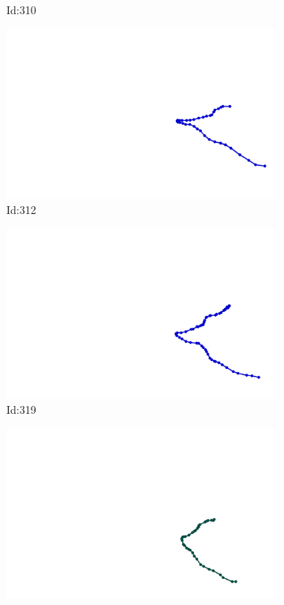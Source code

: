 \documentclass[12pt,twoside]{report}
\begin{document}
\begin{figure}
\begin{subfigure}[b]{0.20\textwidth}
\caption{Id:310}
\end{subfigure}
\begin{subfigure}[b]{0.20\textwidth}
\centering
\includegraphics[width=\textwidth]{../trajectories/312.png}
\caption{Id:312}
\end{subfigure}
\begin{subfigure}[b]{0.20\textwidth}
\centering
\includegraphics[width=\textwidth]{../trajectories/319.png}
\caption{Id:319}
\end{subfigure}
\begin{subfigure}[b]{0.20\textwidth}
\centering
\includegraphics[width=\textwidth]{../trajectories/332.png}

\end{subfigure}
\end{figure}
\end{document}
